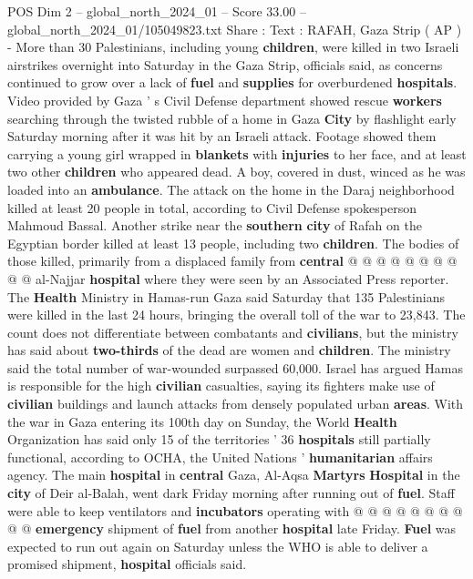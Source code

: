 \begin{textsample}{POS Dim 2 – global\_north\_2024\_01 – Score 33.00 – global\_north\_2024\_01/105049823.txt}  \label{ex:f2_pos_202}
Share : Text : RAFAH, Gaza Strip ( AP ) - More than 30 Palestinians, including young \textbf{children}, were killed in two Israeli airstrikes overnight into Saturday in the Gaza Strip, officials said, as concerns continued to grow over a lack of \textbf{fuel} and \textbf{supplies} for overburdened \textbf{hospitals}.
Video provided by Gaza ' s Civil Defense department showed rescue \textbf{workers} searching through the twisted rubble of a home in Gaza \textbf{City} by flashlight early Saturday morning after it was hit by an Israeli attack.
Footage showed them carrying a young girl wrapped in \textbf{blankets} with \textbf{injuries} to her face, and at least two other \textbf{children} who appeared dead.
A boy, covered in dust, winced as he was loaded into an \textbf{ambulance}.
The attack on the home in the Daraj neighborhood killed at least 20 people in total, according to Civil Defense spokesperson Mahmoud Bassal.
Another strike near the \textbf{southern} \textbf{city} of Rafah on the Egyptian border killed at least 13 people, including two \textbf{children}.
The bodies of those killed, primarily from a displaced family from \textbf{central} @ @ @ @ @ @ @ @ @ @ al-Najjar \textbf{hospital} where they were seen by an Associated Press reporter.
The \textbf{Health} Ministry in Hamas-run Gaza said Saturday that 135 Palestinians were killed in the last 24 hours, bringing the overall toll of the war to 23,843.
The count does not differentiate between combatants and \textbf{civilians}, but the ministry has said about \textbf{two-thirds} of the dead are women and \textbf{children}.
The ministry said the total number of war-wounded surpassed 60,000.
Israel has argued Hamas is responsible for the high \textbf{civilian} casualties, saying its fighters make use of \textbf{civilian} buildings and launch attacks from densely populated urban \textbf{areas}.
With the war in Gaza entering its 100th day on Sunday, the World \textbf{Health} Organization has said only 15 of the territories ' 36 \textbf{hospitals} still partially functional, according to OCHA, the United Nations ' \textbf{humanitarian} affairs agency.
The main \textbf{hospital} in \textbf{central} Gaza, Al-Aqsa \textbf{Martyrs} \textbf{Hospital} in the \textbf{city} of Deir al-Balah, went dark Friday morning after running out of \textbf{fuel}.
Staff were able to keep ventilators and \textbf{incubators} operating with @ @ @ @ @ @ @ @ @ @ \textbf{emergency} shipment of \textbf{fuel} from another \textbf{hospital} late Friday. \textbf{Fuel} was expected to run out again on Saturday unless the WHO is able to deliver a promised shipment, \textbf{hospital} officials said.

\end{textsample}
